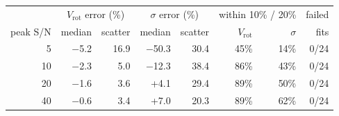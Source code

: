 \begin{tabular}{r rr rr rr r}
\toprule
 & \multicolumn{2}{c}{$V_\mathrm{rot}$ error (\%)} & \multicolumn{2}{c}{$\sigma$ error (\%)} & \multicolumn{2}{c}{within 10\% / 20\%} & failed \\
peak S/N & median & scatter & median & scatter & $V_\mathrm{rot}$ & $\sigma$ & fits \\
\midrule
5 & $-$5.2 & 16.9 & $-$50.3 & 30.4 & 45\% & 14\% & 0/24 \\
10 & $-$2.3 & 5.0 & $-$12.3 & 38.4 & 86\% & 43\% & 0/24 \\
20 & $-$1.6 & 3.6 & +4.1 & 29.4 & 89\% & 50\% & 0/24 \\
40 & $-$0.6 & 3.4 & +7.0 & 20.3 & 89\% & 62\% & 0/24 \\
\bottomrule
\end{tabular}
